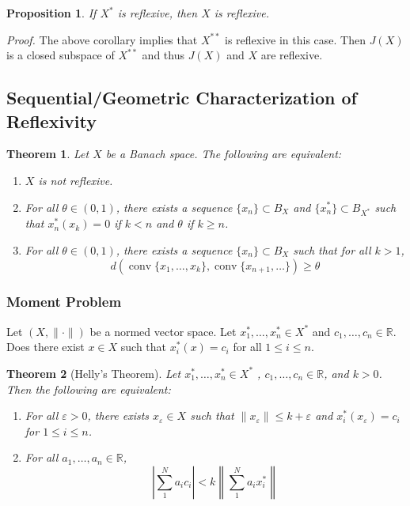 \documentclass[11pt, reqno]{article}
\theoremstyle{plain}
\newtheorem*{theorem}{Theorem}
\newtheorem*{proposition}{Proposition}
\theoremstyle{definition}
\theoremstyle{remark}
\renewcommand{\epsilon}{\varepsilon}
\newcommand{\RR}{\mathbb{R}}
\begin{document}
\begin{proposition}
    If $X^*$ is reflexive, then $X$ is reflexive. 
\end{proposition}

\textit{Proof.} The above corollary implies that $X^{**}$ is reflexive in this case. Then $J(X)$ is a closed subspace
of $X^{**}$ and thus $J(X)$ and $X$ are reflexive.

\subsection*{Sequential/Geometric Characterization of Reflexivity}

\begin{theorem}
    Let $X$ be a Banach space. The following are equivalent:
    \begin{enumerate}
        \item $X$ is not reflexive.
        \item For all $\theta \in (0,1)$, there exists a sequence $\{x_n\} \subset B_X$ and $\{x_n^*\} \subset B_{X^*}$ 
        such that $x_n^*(x_k) = 0$ if $k < n$ and $\theta$ if $k \geq n$.
        \item For all $\theta \in (0,1)$, there exists a sequence $\{x_n\} \subset B_X$ such that for all $k > 1$,
        \[d(\operatorname{conv}\{x_1, \dots, x_k\}, \operatorname{conv}\{x_{n+1}, \dots\}) \geq \theta\]
    \end{enumerate}
\end{theorem}

\subsubsection*{Moment Problem}

Let $(X, \|\cdot\|)$ be a normed vector space. Let $x_1^*, \dots, x_n^* \in X^*$ and $c_1, \dots, c_n \in \RR$. 
Does there exist $x \in X$ such that $x_i^*(x) = c_i$ for all $1 \leq i \leq n$. 

\begin{theorem}[Helly's Theorem]
    Let $x_1^*,\dots, x_n^* \in X^*$ , $c_1,\dots, c_n \in \RR$, and $k > 0$. Then the following are equivalent:
    \begin{enumerate}
        \item For all $\epsilon > 0$, there exists $x_\epsilon \in X$ such that $\|x_\epsilon\| \leq k + \epsilon$
        and $x_i^*(x_\epsilon) = c_i$ for $1 \leq i \leq n$.
        \item For all $a_1,\dots, a_n \in \RR$, 
        \[
            \left|\sum_1^N a_i c_i\right| < k\left\| \sum_1^N a_i x_i^*\right\|
        \]
    \end{enumerate}
\end{theorem}
\end{document}
